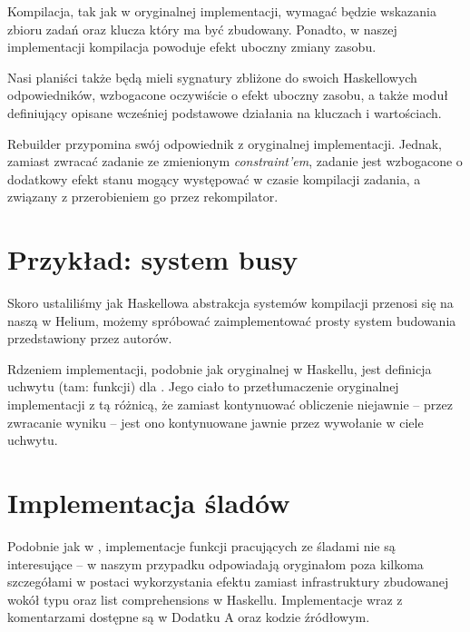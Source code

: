 Kompilacja, tak jak w oryginalnej implementacji, wymagać będzie wskazania zbioru zadań oraz klucza który ma być zbudowany. Ponadto, w  naszej implementacji kompilacja powoduje efekt uboczny zmiany zasobu.

Nasi planiści także będą mieli sygnatury zbliżone do swoich Haskellowych odpowiedników, wzbogacone oczywiście o efekt uboczny zasobu, a także moduł definiujący opisane wcześniej podstawowe działania na kluczach i wartościach.



Rebuilder przypomina swój odpowiednik z oryginalnej implementacji. Jednak, zamiast zwracać zadanie ze zmienionym \textit{constraint'em}, zadanie jest wzbogacone o dodatkowy efekt stanu mogący występować w czasie kompilacji zadania, a związany z przerobieniem go przez rekompilator.

\section{Przykład: system busy}

Skoro ustaliliśmy jak Haskellowa abstrakcja systemów kompilacji przenosi się na naszą w Helium, możemy spróbować zaimplementować prosty system budowania  przedstawiony przez autorów.



Rdzeniem implementacji, podobnie jak oryginalnej w Haskellu, jest definicja uchwytu (tam: funkcji) dla . Jego ciało to przetłumaczenie oryginalnej implementacji z tą różnicą, że zamiast kontynuować obliczenie niejawnie -- przez zwracanie wyniku -- jest ono kontynuowane jawnie przez wywołanie  w ciele uchwytu.

\section{Implementacja śladów}

Podobnie jak w \BSaLC{}, implementacje funkcji pracujących ze śladami nie są interesujące -- w naszym przypadku odpowiadają oryginałom poza kilkoma szczegółami w postaci wykorzystania efektu  zamiast infrastruktury zbudowanej wokół typu  oraz list comprehensions w Haskellu. Implementacje wraz z komentarzami dostępne są w Dodatku A oraz kodzie źródłowym.

